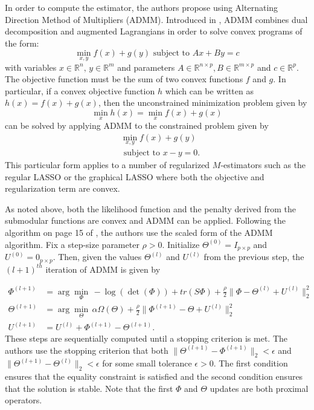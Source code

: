 \documentclass{uwstat572}
\theoremstyle{remark}
\theoremstyle{definition}
\begin{document}
In order to compute the estimator, the authors propose using Alternating Direction Method of Multipliers (ADMM).  Introduced in \cite{Boyd2011}, ADMM combines dual decomposition and augmented Lagrangians in order to solve convex programs of the form:
\begin{equation*}
    \min_{x,y} f(x) + g(y) {\text{  subject to }} Ax + By = c
\end{equation*}
with variables $x \in \mathbb{R}^n, \, y \in \mathbb{R}^m$ and parameters $A \in \mathbb{R}^{n \times p}, B \in \mathbb{R}^{m \times p}$ and $c \in \mathbb{R}^p$.  The objective function must be the sum of two convex functions $f$ and $g$.  In particular, if a convex objective function $h$ which can be written as $h(x) = f(x) + g(x)$, then the unconstrained minimization problem given by
\begin{equation*}
\min_{x} h(x) = \min_{x} f(x) + g(x)
\end{equation*}
can be solved by applying ADMM to the constrained problem given by
\begin{align*}
& \min_{x,y} f(x) + g(y) 
\\
& {\text{ subject to }} x - y = 0.
\end{align*}
This particular form applies to a number of regularized $M$-estimators such as the regular LASSO or the graphical LASSO where both the objective and regularization term are convex.  

As noted above, both the likelihood function and the penalty derived from the submodular functions are convex and ADMM can be applied. Following the algorithm on page 15 of \cite{Boyd2011}, the authors use the scaled form of the ADMM algorithm.  Fix a step-size parameter $\rho > 0$.  Initialize $\Theta^{(0)} = I_{p\times p}$ and $U^{(0)} = 0_{p \times p}$.  Then, given the values $\Theta^{(l)}$ and $U^{(l)}$ from the previous step, the $(l+1)^{th}$ iteration of ADMM is given by

\begin{align}
\Phi^{(l+1)} & =  \arg\min_{\Phi} \, -\log(\det(\Phi)) + tr(S \Phi) + \frac{\rho}{2}\| \Phi - \Theta^{(l)} + U^{(l)}\|_2^2
\label{likprox}
\\
\Theta^{(l+1)} & = \arg \min_{\Theta} \, \alpha \Omega(\Theta) + \frac{\rho}{2} \| \Phi^{(l+1)} - \Theta + U^{(l)} \|_2^2
\label{omegaprox}
\\
U^{(l+1)} & = U^{(l)} + \Phi^{(l+1)} - \Theta^{(l+1)}.
\label{resid}
\end{align}
These steps are sequentially computed until a stopping criterion is met.  The authors use the stopping criterion that both $\|\Theta^{(l+1)} - \Phi^{(l+1)}\|_2 < \epsilon$ and $\|\Theta^{(l+1)} - \Theta^{(l)}\|_2 < \epsilon$ for some small tolerance $\epsilon > 0$.  The first condition ensures that the equality constraint is satisfied and the second condition ensures that the solution is stable.  Note that the first $\Phi$ and $\Theta$ updates are both proximal operators.
\end{document}
